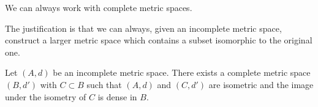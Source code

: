 
\sbasic




























\sstart
{}


We can always work with
complete metric spaces.

The justification is that
we can always, given an incomplete
metric space, construct a larger
metric space which contains a
subset isomorphic to the original
one.


\begin{prop}
Let $(A, d)$ be an
incomplete metric space.
There exists a complete metric
space
$(B, d')$ with $C \subset B$
such that $(A, d)$ and
$(C, d')$ are isometric and the image
under the isometry of $C$ is
dense in $B$.
\end{prop}
\strats
